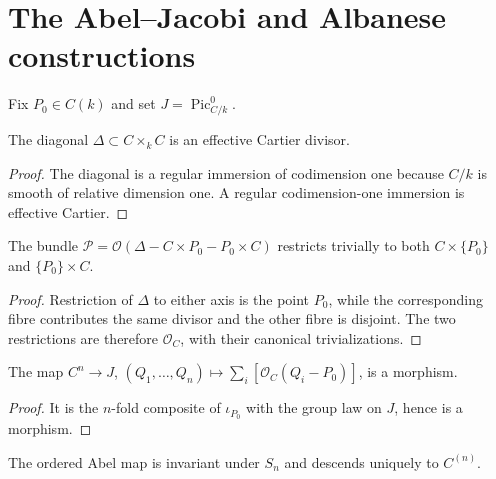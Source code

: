 \chapter{The Abel--Jacobi and Albanese constructions}
\label{mk-ch-abel-jacobi}

Fix \(P_0\in C(k)\) and set \(J=\operatorname{Pic}^0_{C/k}\).

\begin{lemma}
  \label{mk-lem-diagonal-cartier}
  \cite{hartshorne-ag,milne-av}
  The diagonal \(\Delta\subset C\times_kC\) is an effective Cartier divisor.
\end{lemma}

\begin{proof}
  The diagonal is a regular immersion of codimension one because \(C/k\) is
  smooth of relative dimension one.  A regular codimension-one immersion is
  effective Cartier.
\end{proof}

\begin{lemma}
  \label{mk-lem-pointed-diagonal-rigidified}
  \cite{milne-av}
  The bundle
  \(\mathcal P=\mathcal O(\Delta-C\times P_0-P_0\times C)\) restricts
  trivially to both \(C\times\{P_0\}\) and \(\{P_0\}\times C\).
\end{lemma}

\begin{proof}
  Restriction of \(\Delta\) to either axis is the point \(P_0\), while the
  corresponding fibre contributes the same divisor and the other fibre is
  disjoint.  The two restrictions are therefore \(\mathcal O_C\), with their
  canonical trivializations.
\end{proof}

\begin{lemma}
  \label{mk-lem-ordered-abel-map}
  \cite{milne-av}
  The map \(C^n\to J\), \((Q_1,\dots,Q_n)\mapsto
  \sum_i[\mathcal O_C(Q_i-P_0)]\), is a morphism.
\end{lemma}

\begin{proof}
  It is the \(n\)-fold composite of \(\iota_{P_0}\) with the group law on
  \(J\), hence is a morphism.
\end{proof}

\begin{lemma}
  \label{mk-lem-symmetric-abel-descent}
  \cite{milne-av}
  The ordered Abel map is invariant under \(S_n\) and descends uniquely to
  \(C^{(n)}\).
\end{lemma}

